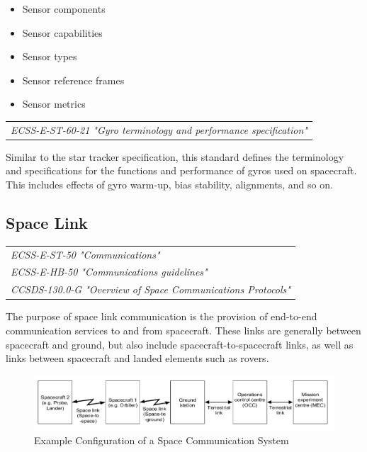 \begin{itemize}
\item Sensor components
\item Sensor capabilities
\item Sensor types
\item Sensor reference frames
\item Sensor metrics
\end{itemize}

\begin{tabular}{l}
\textit{ECSS-E-ST-60-21 "Gyro terminology and performance specification" \cite{ECSS-E-ST-60-21}} \\
\end{tabular}

Similar to the star tracker specification, this standard defines the terminology and specifications for the functions and performance of gyros used on spacecraft. This includes effects of gyro warm-up, bias stability, alignments, and so on. 


\subsection{Space Link}
\label{sec:Space Link}

\begin{tabular}{l}
\textit{ECSS-E-ST-50 "Communications" \cite{ECSS-E-ST-50}} \\
\textit{ECSS-E-HB-50 "Communications guidelines" \cite{ECSS-E-HB-50}} \\
\textit{CCSDS-130.0-G "Overview of Space Communications Protocols" \cite{CCSDS-130.0-G}}
\end{tabular}

The purpose of space link communication is the provision of end-to-end communication services to and from spacecraft. These links are generally between spacecraft and ground, but also include spacecraft-to-spacecraft links, as well as links between spacecraft and landed elements such as rovers. 

\begin{figure}[h]
\centering\includegraphics[scale=0.4]{fig/example_configuration_of_a_space_communication_system}
\caption{Example Configuration of a Space Communication System}
\label{fig:Example Configuration of a Space Communication System}
\end{figure}

